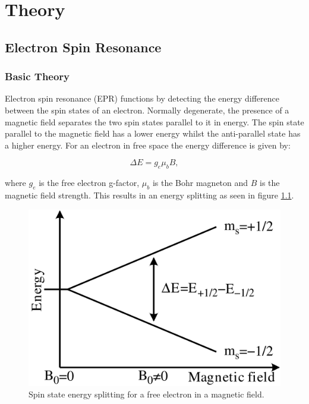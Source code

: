
\chapter{Theory}

\section{Electron Spin Resonance}
\subsection{Basic Theory}

Electron spin resonance (EPR) functions by detecting the energy difference between the spin states of an electron.
Normally degenerate, the presence of a magnetic field separates the two spin states parallel to it in energy.
The spin state parallel to the magnetic field has a lower energy whilst the anti-parallel state has a higher energy.
For an electron in free space the energy difference is given by:

\begin{equation}
\Delta E = g_e\mu_bB,
\end{equation}

where $g_e$ is the free electron g-factor, $\mu_b$ is the Bohr magneton and $B$ is the magnetic field strength. 
This results in an energy splitting as seen in figure \ref{fig:elecSplit}. 

\begin{figure}
\includegraphics[width = \columnwidth]{Figures/EPR_splitting.png}
\caption[Free electron level splitting]{Spin state energy splitting for a free electron in a magnetic field.}
\label{fig:elecSplit}
\end{figure}

